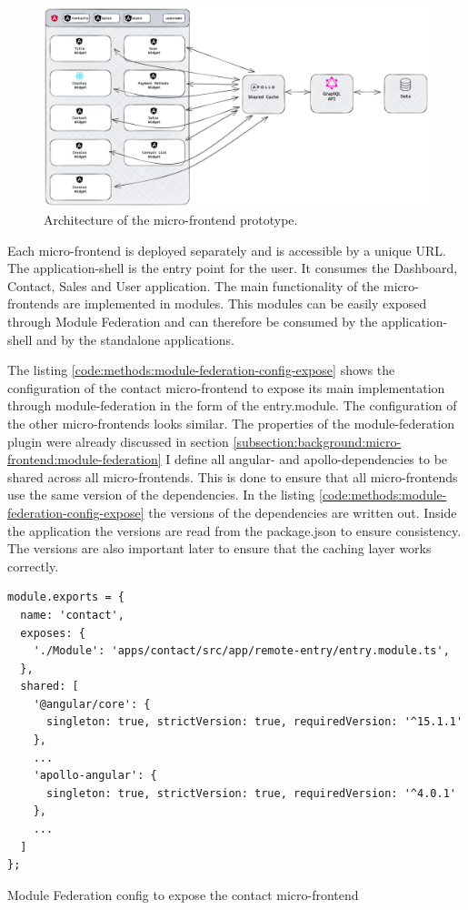 \ifshowImages
\begin{figure}[H]
    \centering
    \includegraphics[width=1\linewidth]{images/ui-dashboard-architecture.png}
    \caption{Architecture of the micro-frontend prototype.}\label{fig:applied-methods:ui-dashboard-architecture}
\end{figure}
\fi

\noindent Each micro-frontend is deployed separately and is accessible by a unique URL. The application-shell is the entry point for the user. It consumes the Dashboard, Contact, Sales and User application. The main functionality of the micro-frontends are implemented in modules. This modules can be easily exposed through Module Federation and can therefore be consumed by the application-shell and by the standalone applications.

\bigskip

\noindent The listing \ref{code:methods:module-federation-config-expose} shows the configuration of the contact micro-frontend to expose its main implementation through module-federation in the form of the entry.module. The configuration of the other micro-frontends looks similar. The properties of the module-federation plugin were already discussed in section \ref{subsection:background:micro-frontend:module-federation} I define all angular- and apollo-dependencies to be shared across all micro-frontends. This is done to ensure that all micro-frontends use the same version of the dependencies. In the listing \ref{code:methods:module-federation-config-expose} the versions of the dependencies are written out. Inside the application the versions are read from the package.json to ensure consistency. The versions are also important later to ensure that the caching layer works correctly.

\ifshowListings
\begin{listing}[H]
    \begin{verbatim}
module.exports = {
  name: 'contact',
  exposes: {
    './Module': 'apps/contact/src/app/remote-entry/entry.module.ts',
  },
  shared: [
    '@angular/core': {
      singleton: true, strictVersion: true, requiredVersion: '^15.1.1' 
    },
    ...
    'apollo-angular': { 
      singleton: true, strictVersion: true, requiredVersion: '^4.0.1' 
    },
    ...
  ]
};
    \end{verbatim}
    \caption{Module Federation config to expose the contact micro-frontend}\label{code:applied-methods:module-federation-config-expose}
\end{listing}
\fi

